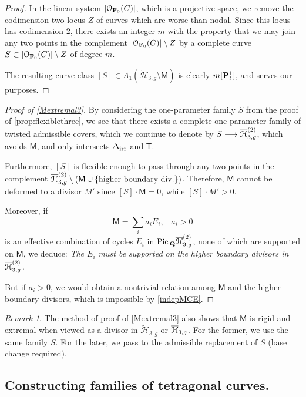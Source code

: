 \documentclass[reqno, 10 pt]{article}
\theoremstyle{definition}
\theoremstyle{remark}
\newtheorem{rmk}[thm]{Remark}
\numberwithin{equation}{section}
\numberwithin{thm}{section}
\numberwithin{prop}{section}
\numberwithin{lem}{section}
\numberwithin{cor}{section}
\numberwithin{conj}{section}
\numberwithin{defn}{section}
\renewcommand{\H}{\mathcal H}
\newcommand{\td}{\widetilde}
\newcommand{\F}{{\mathbf F}}
\renewcommand{\to}{\longrightarrow}
\newcommand{\sfT}{{\mathsf T}}
\newcommand{\sfM}{{\mathsf M}}
\newcommand{\cO}{{\mathcal O}}
\newcommand {\Q}{{\bf Q}}
\renewcommand{\P}{{\bf P}}
\renewcommand{\F}{{\bf F}}
\renewcommand{\H}{{\mathcal{H}}}
\newcommand {\Pic}{{\rm Pic}\,}
\newcommand {\irr}{{\rm irr}}
\begin{document}
\begin{proof}
In the linear system $|\cO_{\F_{0}}(C)|$, which is a projective space, we remove the codimension two locus $Z$ of curves which are worse-than-nodal. Since this locus has codimension $2$, there exists an integer $m$ with the property that we may join any two points in the complement $|\cO_{\F_{0}}(C)| \setminus Z$ by a complete curve $S \subset |\cO_{\F_{0}}(C)| \setminus Z$ of degree $m$. 

The resulting curve class $[S] \in A_{1}(\td{\H}_{3,g} \setminus \sfM)$ is clearly $m[\P^{1}_{t}]$, and serves our purposes.
\end{proof}

\begin{proof}[Proof of \autoref{Mextremal3}]
By considering the one-parameter family $S$ from the proof of \autoref{prop:flexiblethree}, we see that there exists a complete one parameter family of twisted admissible covers, which we continue to denote by $S \to \o{\H}^{(2)}_{3,g}$, which avoids $\sfM$, and only intersects $\Delta_{\irr}$ and $\sfT$.

Furthermore, $[S]$ is flexible enough to pass through any two points in the complement $\o{\H}^{(2)}_{3,g} \setminus (\sfM \cup \{\text{higher boundary div.}\})$.  Therefore, $\sfM$ cannot be deformed to a divisor $M'$ since $[S] \cdot \sfM = 0$, while $[S] \cdot M' > 0$.

Moreover, if \[\sfM = \sum_{i} a_{i}E_{i}, \,\,\,\,\,  a_{i}>0\] is an effective combination of cycles $E_{i}$ in $\Pic_{\Q}\o{\H}^{(2)}_{3,g}$, none of which are supported on $\sfM$, we deduce: {\sl The $E_{i}$ must be supported on the higher boundary divisors in $\o{\H}^{(2)}_{3,g}$.} 

But if $a_{i} > 0$, we would obtain a nontrivial relation among $\sfM$ and the higher boundary divisors, which is impossible by \autoref{indepMCE}.
\end{proof}

\begin{rmk}
The method of proof of \autoref{Mextremal3} also shows that $\sfM$ is rigid and extremal when viewed as a divisor in $\widetilde{\H}_{3,g}$ or $\o{\H}_{3,g}$. For the former, we use the same family $S$.  For the later, we pass to the admissible replacement of $S$ (base change required).
\end{rmk}

\subsection{Constructing families of tetragonal curves.}\label{TetragonalFamilies}
\end{document}
